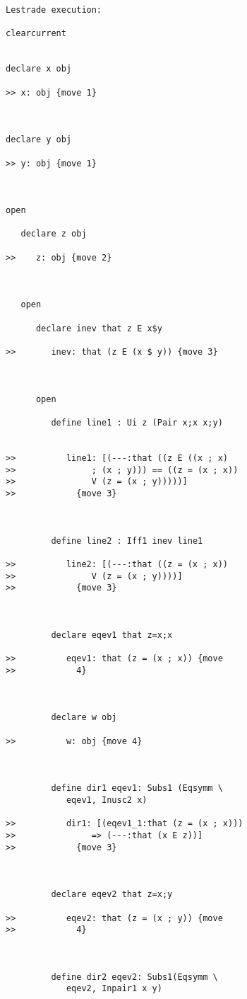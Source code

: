 \documentclass[12pt]{article}
\begin{document}
\begin{verbatim}Lestrade execution:

clearcurrent


declare x obj

>> x: obj {move 1}



declare y obj

>> y: obj {move 1}



open

   declare z obj

>>    z: obj {move 2}



   open

      declare inev that z E x$y

>>       inev: that (z E (x $ y)) {move 3}



      open

         define line1 : Ui z (Pair x;x x;y)


>>          line1: [(---:that ((z E ((x ; x)
>>               ; (x ; y))) == ((z = (x ; x))
>>               V (z = (x ; y)))))]
>>            {move 3}



         define line2 : Iff1 inev line1

>>          line2: [(---:that ((z = (x ; x))
>>               V (z = (x ; y))))]
>>            {move 3}



         declare eqev1 that z=x;x

>>          eqev1: that (z = (x ; x)) {move
>>            4}



         declare w obj

>>          w: obj {move 4}



         define dir1 eqev1: Subs1 (Eqsymm \
            eqev1, Inusc2 x)

>>          dir1: [(eqev1_1:that (z = (x ; x)))
>>               => (---:that (x E z))]
>>            {move 3}



         declare eqev2 that z=x;y

>>          eqev2: that (z = (x ; y)) {move
>>            4}



         define dir2 eqev2: Subs1(Eqsymm \
            eqev2, Inpair1 x y)


\end{verbatim}
\end{document}
